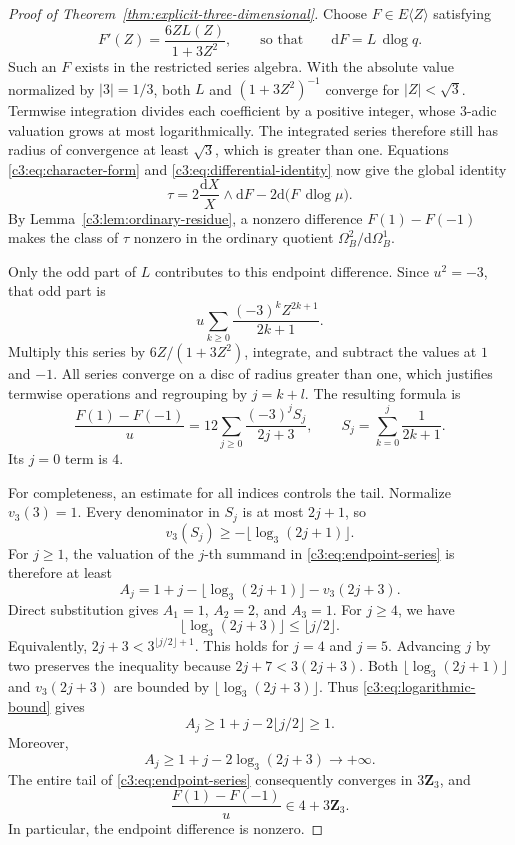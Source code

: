 \documentclass[11pt,a4paper]{amsart}
\numberwithin{equation}{section}
\theoremstyle{definition}
\theoremstyle{remark}
\newcommand{\CthreeZ}{\mathbf{Z}}
\newcommand{\Cthreedd}{\mathrm{d}}
\DeclareMathOperator{\Cthreedlog}{dlog}
\begin{document}
\begin{proof}[Proof of Theorem~\ref{thm:explicit-three-dimensional}]
Choose $F\in E\langle Z\rangle$ satisfying
\begin{equation}\label{c3:eq:primitive-derivative}
 F'(Z)=\frac{6ZL(Z)}{1+3Z^2},
 \qquad\text{so that}\qquad
 \Cthreedd F=L\,\Cthreedlog q.
\end{equation}
Such an $F$ exists in the restricted series algebra.
With the absolute value normalized by $|3|=1/3$, both $L$ and
$(1+3Z^2)^{-1}$ converge for $|Z|<\sqrt3$.
Termwise integration divides each coefficient by a positive integer,
whose $3$-adic valuation grows at most logarithmically.
The integrated series therefore still has radius of convergence at
least $\sqrt3$, which is greater than one.
Equations \eqref{c3:eq:character-form} and
\eqref{c3:eq:differential-identity} now give the global identity
\begin{equation}\label{c3:eq:character-residue}
 \tau=
 2\frac{\Cthreedd X}{X}\wedge\Cthreedd F
       -2\Cthreedd\bigl(F\,\Cthreedlog\mu\bigr).
\end{equation}
By Lemma~\ref{c3:lem:ordinary-residue}, a nonzero difference
$F(1)-F(-1)$ makes the class of $\tau$ nonzero in the ordinary
quotient $\Omega_B^2/\Cthreedd\Omega_B^1$.

Only the odd part of $L$ contributes to this endpoint difference.
Since $u^2=-3$, that odd part is
\[
 u\sum_{k\geq0}\frac{(-3)^k Z^{2k+1}}{2k+1}.
\]
Multiply this series by $6Z/(1+3Z^2)$, integrate, and subtract the
values at $1$ and $-1$.
All series converge on a disc of radius greater than one, which
justifies termwise operations and regrouping by $j=k+l$.
The resulting formula is
\begin{equation}\label{c3:eq:endpoint-series}
 \frac{F(1)-F(-1)}{u}
   =12\sum_{j\geq0}\frac{(-3)^jS_j}{2j+3},
 \qquad
 S_j=\sum_{k=0}^j\frac1{2k+1}.
\end{equation}
Its $j=0$ term is $4$.

For completeness, an estimate for all indices controls the tail.
Normalize $v_3(3)=1$.
Every denominator in $S_j$ is at most $2j+1$, so
\[
 v_3(S_j)\geq-\lfloor\log_3(2j+1)\rfloor.
\]
For $j\geq1$, the valuation of the $j$-th summand in
\eqref{c3:eq:endpoint-series} is therefore at least
\[
 A_j=1+j-\lfloor\log_3(2j+1)\rfloor-v_3(2j+3).
\]
Direct substitution gives $A_1=1$, $A_2=2$, and $A_3=1$.
For $j\geq4$, we have
\begin{equation}\label{c3:eq:logarithmic-bound}
 \lfloor\log_3(2j+3)\rfloor\leq\lfloor j/2\rfloor.
\end{equation}
Equivalently, $2j+3<3^{\lfloor j/2\rfloor+1}$.
This holds for $j=4$ and $j=5$.
Advancing $j$ by two preserves the inequality because
$2j+7<3(2j+3)$.
Both $\lfloor\log_3(2j+1)\rfloor$ and $v_3(2j+3)$ are bounded by
$\lfloor\log_3(2j+3)\rfloor$.
Thus \eqref{c3:eq:logarithmic-bound} gives
\[
 A_j\geq1+j-2\lfloor j/2\rfloor\geq1.
\]
Moreover,
\[
 A_j\geq1+j-2\log_3(2j+3)\longrightarrow+\infty.
\]
The entire tail of \eqref{c3:eq:endpoint-series} consequently converges
in $3\CthreeZ_3$, and
\begin{equation}\label{c3:eq:endpoint-nonzero}
 \frac{F(1)-F(-1)}{u}\in4+3\CthreeZ_3.
\end{equation}
In particular, the endpoint difference is nonzero.


\end{proof}
\end{document}
